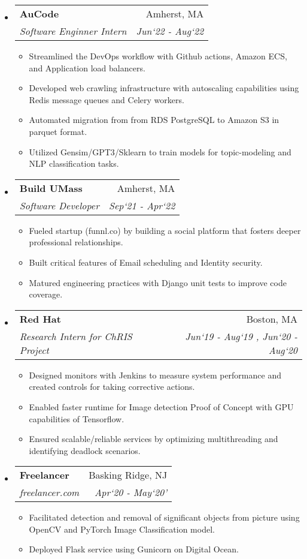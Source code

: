 \documentclass[letterpaper,8pt]{article}
\makeatletter
\newcommand{\resitem}[1]{\item #1 \vspace{-1pt}}
\newcommand{\resheading}[1]{{\normalsize \parashade[.9]{sharpcorners}{\textbf{#1 \vphantom{p\^{E}}}}}}
\newcommand{\ressubheading}[4]{
\begin{tabular*}{6.5in}{l@{\extracolsep{\fill}}r}
		\textbf{#1} & #2 \\
		\textit{#3} & \textit{#4} \\
\end{tabular*}\vspace{-4pt}}
\makeatother
\begin{document}
\resheading{Work Experience}
\begin{itemize}
\item
	\ressubheading{AuCode}{Amherst, MA}{Software Enginner Intern}{Jun`22 - Aug`22}
	\begin{itemize}
		\resitem{Streamlined the DevOps workflow with Github actions, Amazon ECS, and Application load balancers.}
		\resitem{Developed web crawling infrastructure with autoscaling capabilities using Redis message queues and Celery workers.}
		\resitem{Automated migration from from RDS PostgreSQL to Amazon S3 in parquet format.}
		\resitem{Utilized Gensim/GPT3/Sklearn to train models for topic-modeling and NLP classification tasks.}
	\end{itemize}

\item
	\ressubheading{Build UMass}{Amherst, MA}{Software Developer}{Sep`21 - Apr`22}
	\begin{itemize}
		\resitem{Fueled startup (funnl.co) by building a social platform that fosters deeper professional relationships.}
		\resitem{Built critical features of Email scheduling and Identity security.}
		\resitem{Matured engineering practices with Django unit tests to improve code coverage.}
	\end{itemize}

\item 
	\ressubheading{Red Hat}{Boston, MA}{Research Intern for ChRIS Project}{Jun`19 - Aug`19 , Jun`20 - Aug`20}
	\begin{itemize}
		\resitem{Designed monitors with Jenkins to measure system performance and created controls for taking corrective actions.}
		\resitem{Enabled faster runtime for Image detection Proof of Concept with GPU capabilities of Tensorflow.}
		\resitem{Ensured scalable/reliable services by optimizing multithreading and identifying deadlock scenarios.}
	\end{itemize}

\item
	\ressubheading{Freelancer}{Basking Ridge, NJ}{freelancer.com}{Apr`20 - May`20'}
	\begin{itemize}
		\resitem{Facilitated detection and removal of significant objects from picture using OpenCV and PyTorch Image Classification model.}
		\resitem{Deployed Flask service using Gunicorn on Digital Ocean.}
	\end{itemize}

\end{itemize}
\end{document}
